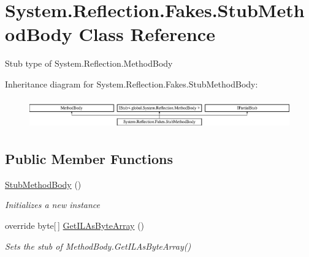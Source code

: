 \hypertarget{class_system_1_1_reflection_1_1_fakes_1_1_stub_method_body}{\section{System.\-Reflection.\-Fakes.\-Stub\-Method\-Body Class Reference}
\label{class_system_1_1_reflection_1_1_fakes_1_1_stub_method_body}
}


Stub type of System.\-Reflection.\-Method\-Body 


Inheritance diagram for System.\-Reflection.\-Fakes.\-Stub\-Method\-Body\-:\begin{figure}[H]
\begin{center}
\leavevmode
\includegraphics[height=1.309942cm]{class_system_1_1_reflection_1_1_fakes_1_1_stub_method_body}
\end{center}
\end{figure}
\subsection*{Public Member Functions}
\begin{DoxyCompactItemize}
\item 
\hyperlink{class_system_1_1_reflection_1_1_fakes_1_1_stub_method_body_a3499c2670908b733b2f94b971d69a91a}{Stub\-Method\-Body} ()
\begin{DoxyCompactList}\small\item\em Initializes a new instance\end{DoxyCompactList}\item 
override byte\mbox{[}$\,$\mbox{]} \hyperlink{class_system_1_1_reflection_1_1_fakes_1_1_stub_method_body_a024325cc5cd7dc061191243251a00d85}{Get\-I\-L\-As\-Byte\-Array} ()
\begin{DoxyCompactList}\small\item\em Sets the stub of Method\-Body.\-Get\-I\-L\-As\-Byte\-Array()\end{DoxyCompactList}\end{DoxyCompactItemize}
